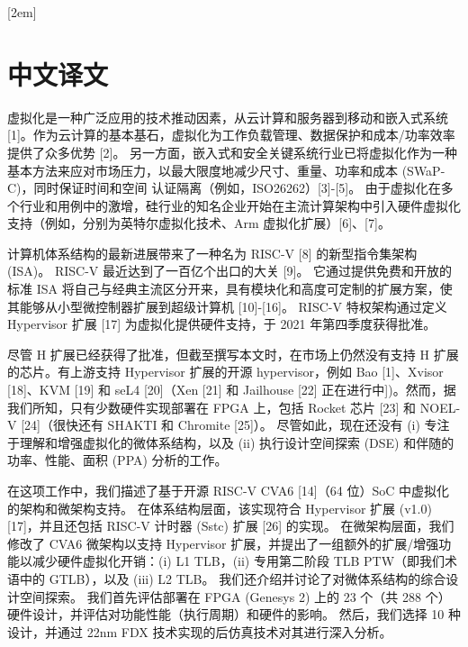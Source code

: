 
[2em]{\vspace{.5\baselineskip}\xiaosan\song}
             {\prechaptername\CJKnumber{\thecontentslabel}\postchaptername\qquad}{}
             {}             %
\setcounter{page}{1}            %
\chapter*{中文译文}

虚拟化是一种广泛应用的技术推动因素，从云计算和服务器到移动和嵌入式系统 [1]。作为云计算的基本基石，虚拟化为工作负载管理、数据保护和成本/功率效率提供了众多优势 [2]。 另一方面，嵌入式和安全关键系统行业已将虚拟化作为一种基本方法来应对市场压力，以最大限度地减少尺寸、重量、功率和成本 (SWaP-C)，同时保证时间和空间 认证隔离（例如，ISO26262）[3]-[5]。 由于虚拟化在多个行业和用例中的激增，硅行业的知名企业开始在主流计算架构中引入硬件虚拟化支持（例如，分别为英特尔虚拟化技术、Arm 虚拟化扩展）[6]、[7]。

计算机体系结构的最新进展带来了一种名为 RISC-V [8] 的新型指令集架构 (ISA)。 RISC-V 最近达到了一百亿个出口的大关 [9]。 它通过提供免费和开放的标准 ISA 将自己与经典主流区分开来，具有模块化和高度可定制的扩展方案，使其能够从小型微控制器扩展到超级计算机 [10]-[16]。 RISC-V 特权架构通过定义 Hypervisor 扩展 [17] 为虚拟化提供硬件支持，于 2021 年第四季度获得批准。

尽管 H 扩展已经获得了批准，但截至撰写本文时，在市场上仍然没有支持 H 扩展的芯片。有上游支持 Hypervisor 扩展的开源 hypervisor，例如 Bao [1]、Xvisor [18]、KVM [19] 和 seL4 [20]（Xen [21] 和 Jailhouse [22] 正在进行中])。然而，据我们所知，只有少数硬件实现部署在 FPGA 上，包括 Rocket 芯片 [23] 和 NOEL-V [24]（很快还有 SHAKTI 和 Chromite [25]）。 尽管如此，现在还没有 (i) 专注于理解和增强虚拟化的微体系结构，以及 (ii) 执行设计空间探索 (DSE) 和伴随的功率、性能、面积 (PPA) 分析的工作。

在这项工作中，我们描述了基于开源 RISC-V CVA6 [14]（64 位）SoC 中虚拟化的架构和微架构支持。 在体系结构层面，该实现符合 Hypervisor 扩展 (v1.0) [17]，并且还包括 RISC-V 计时器 (Sstc) 扩展 [26] 的实现。 在微架构层面，我们修改了 CVA6 微架构以支持 Hypervisor 扩展，并提出了一组额外的扩展/增强功能以减少硬件虚拟化开销：(i) L1 TLB，(ii) 专用第二阶段 TLB PTW（即我们术语中的 GTLB），以及 (iii) L2 TLB。 我们还介绍并讨论了对微体系结构的综合设计空间探索。 我们首先评估部署在 FPGA (Genesys 2) 上的 23 个（共 288 个）硬件设计，并评估对功能性能（执行周期）和硬件的影响。 然后，我们选择 10 种设计，并通过 22nm FDX 技术实现的后仿真技术对其进行深入分析。

